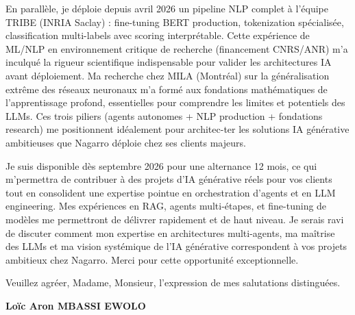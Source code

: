 \documentclass[a4paper,11pt]{article}
\begin{document}
\vspace{0.8em}
\noindent En parallèle, je déploie depuis avril 2026 un pipeline NLP complet à l'équipe TRIBE (INRIA Saclay) : fine-tuning BERT production, tokenization spécialisée, classification multi-labels avec scoring interprétable. Cette expérience de ML/NLP en environnement critique de recherche (financement CNRS/ANR) m'a inculqué la rigueur scientifique indispensable pour valider les architectures IA avant déploiement. Ma recherche chez MILA (Montréal) sur la généralisation extrême des réseaux neuronaux m'a formé aux fondations mathématiques de l'apprentissage profond, essentielles pour comprendre les limites et potentiels des LLMs. Ces trois piliers (agents autonomes + NLP production + fondations research) me positionnent idéalement pour architec-ter les solutions IA générative ambitieuses que Nagarro déploie chez ses clients majeurs.

\vspace{0.8em}
\noindent Je suis disponible dès septembre 2026 pour une alternance 12 mois, ce qui m'permettra de contribuer à des projets d'IA générative réels pour vos clients tout en consolident une expertise pointue en orchestration d'agents et en LLM engineering. Mes expériences en RAG, agents multi-étapes, et fine-tuning de modèles me permettront de délivrer rapidement et de haut niveau. Je serais ravi de discuter comment mon expertise en architectures multi-agents, ma maîtrise des LLMs et ma vision systémique de l'IA générative correspondent à vos projets ambitieux chez Nagarro. Merci pour cette opportunité exceptionnelle.

\vspace{1.5em}
\noindent Veuillez agr\'eer, Madame, Monsieur, l'expression de mes salutations distingu\'ees.

\vspace{2em}
\noindent \textbf{Lo\"ic Aron MBASSI EWOLO}
\end{document}
